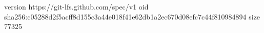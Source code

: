 version https://git-lfs.github.com/spec/v1
oid sha256:c05288d2f5acff8d155c3a44e018f41e62db1a2ec670d08efc7c44f810984894
size 77325
